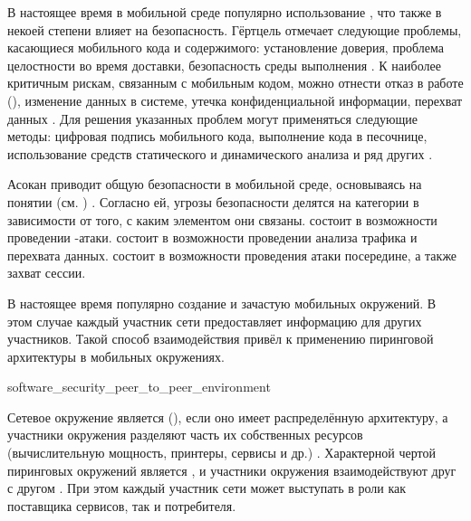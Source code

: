 %
%
В настоящее время в мобильной среде популярно использование , что также в некоей степени влияет на безопасность. 
%
Гёртцель отмечает следующие проблемы, касающиеся мобильного кода и содержимого: установление доверия, проблема целостности во время доставки, безопасность среды выполнения .
%
К наиболее критичным рискам, связанным с мобильным кодом, можно отнести отказ в работе (), изменение данных в системе, утечка конфиденциальной информации, перехват данных .
%
Для решения указанных проблем могут применяться следующие методы: цифровая подпись мобильного кода, выполнение кода в песочнице, использование средств статического и динамического анализа и ряд других    . 

%
Асокан приводит общую  безопасности в мобильной среде, основываясь на понятии  (см. ) .
%
Согласно ей, угрозы безопасности делятся на категории в зависимости от того, с каким элементом  они связаны. 
%
 состоит в возможности проведении -атаки.
%
 состоит в возможности проведении анализа трафика и перехвата данных.
%
 состоит в возможности проведения атаки посередине, а также захват сессии.

%
В настоящее время популярно создание  и зачастую  мобильных окружений. 
%
В этом случае каждый участник сети предоставляет информацию для других участников. 
%
Такой способ взаимодействия привёл к применению пиринговой архитектуры в мобильных окружениях. 


	{software_security_peer_to_peer_environment}

%
Сетевое окружение является  (), если оно имеет распределённую архитектуру, а участники окружения разделяют часть их собственных ресурсов (вычислительную мощность, принтеры, сервисы и др.) .
%
Характерной чертой пиринговых окружений является , и участники окружения взаимодействуют друг с другом . 
%
При этом каждый участник сети может выступать в роли как поставщика сервисов, так и потребителя. 

